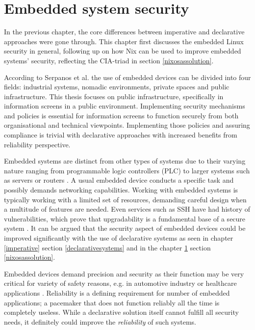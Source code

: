 \chapter{Embedded system security} \label{embedded}

In the previous chapter, the core differences between imperative and
declarative approaches were gone through. This chapter first discusses
the embedded Linux security in general, following up on how Nix can be
used to improve embedded systems' security, reflecting the CIA-triad in section
\ref{nixosassolution}.

According to Serpanos et al. \cite{serpanos2013security} the use of embedded devices can be
divided into four fields: industrial systems, nomadic environments,
private spaces and public infrastructure. This thesis focuses on public
infrastructure, specifically in information screens in a public
environment. Implementing security mechanisms and policies is
essential for information screens to function securely from both
organisational and technical viewpoints. Implementing those policies
and assuring compliance is trivial with declarative approaches with
increased benefits from reliability perspective.

Embedded systems are distinct from other types of systems due to their
varying nature ranging from programmable logic controllers (PLC) to
larger systems such as servers or
routers \cite{fysarakis2014embedded}. A usual embedded device
conducts a specific task and possibly demands networking
capabilities. Working with embedded systems is typically working with a
limited set of resources, demanding careful design when a multitude of
features are needed. Even services such as SSH have
had history of vulnerabilities, which prove that upgradability is a
fundamental base of a secure system
\cite{secopsolutionHistorySecOps}. It can be argued that the security aspect of
embedded devices could be improved significantly with the use of
declarative systems as seen in chapter \ref{imperative} section
\ref{declarativesystems} and in the chapter \ref{embedded} section
\ref{nixosassolution}.

Embedded devices demand precision and security as their function may
be very critical for variety of safety reasons, e.g. in automotive
industry or healthcare applications \cite{turab2019secure,
  fysarakis2014embedded}. Reliability is a defining requirement for
number of embedded applications; a pacemaker that does not function reliably all
the time is completely useless. While a declarative solution
itself cannot fulfill all security needs, it definitely could improve
the \textit{reliability} of such systems.

